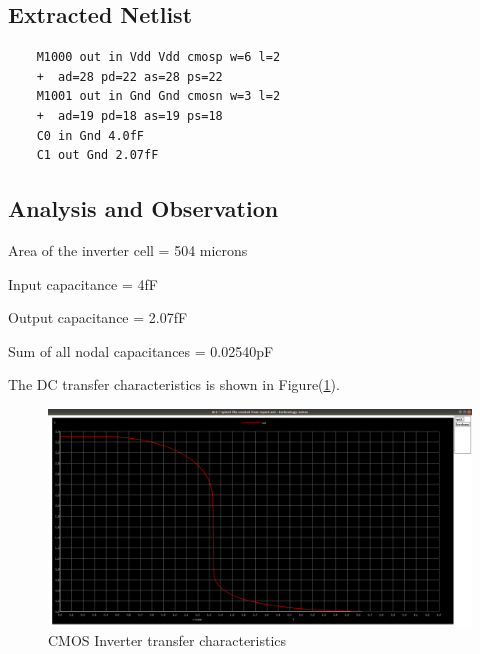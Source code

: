 \documentclass[12pt]{article}
\begin{document}
	\subsection{Extracted Netlist}
	\begin{lstlisting}
	M1000 out in Vdd Vdd cmosp w=6 l=2
	+  ad=28 pd=22 as=28 ps=22
	M1001 out in Gnd Gnd cmosn w=3 l=2
	+  ad=19 pd=18 as=19 ps=18
	C0 in Gnd 4.0fF
	C1 out Gnd 2.07fF
	\end{lstlisting}
	
	\subsection{Analysis and Observation}
	Area of the inverter cell = 504 microns 
	\par Input capacitance = 4fF
	\par Output capacitance = 2.07fF
	\par Sum of all nodal capacitances = 0.02540pF
	
	The DC transfer characteristics is shown in Figure(\ref{fig::layout_dc}). 
	\begin{figure}[H]
		\begin{center}
			\includegraphics[scale = 0.2]{images/layout_dc.png}
			\caption{CMOS Inverter transfer characteristics}
			\label{fig::layout_dc}
		\end{center}
	\end{figure}
	
\end{document}
